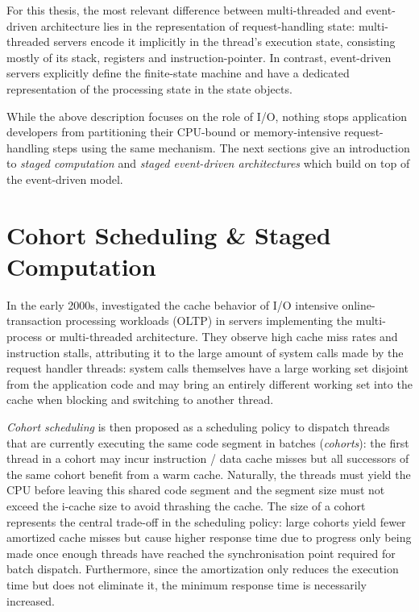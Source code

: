 \documentclass[12pt,a4paper]{book}
\begin{document}
For this thesis, the most relevant difference between multi-threaded and event-driven architecture lies in the representation of request-handling state:
multi-threaded servers encode it implicitly in the thread's execution state, consisting mostly of its stack, registers and instruction-pointer.
In contrast, event-driven servers explicitly define the finite-state machine and have a dedicated representation of the processing state in the state objects.

While the above description focuses on the role of I/O, nothing stops application developers from partitioning their CPU-bound or memory-intensive request-handling steps using the same mechanism.
The next sections give an introduction to \emph{staged computation} and \emph{staged event-driven architectures} which build on top of the event-driven model.

\section{Cohort Scheduling \& Staged Computation}\label{ch:relwork:cohort}
In the early 2000s, \citeauthor*{cohort} investigated the cache behavior of I/O intensive online-transaction processing workloads (OLTP) in servers implementing the multi-process or multi-threaded architecture.
They observe high cache miss rates and instruction stalls, attributing it to the large amount of system calls made by the request handler threads:
system calls themselves have a large working set disjoint from the application code and may bring an entirely different working set into the cache when blocking and switching to another thread.~\cite{cohort}

\emph{Cohort scheduling} is then proposed as a scheduling policy to dispatch threads that are currently executing the same code segment in batches (\emph{cohorts}):
the first thread in a cohort may incur instruction / data cache misses but all successors of the same cohort benefit from a warm cache.
Naturally, the threads must yield the CPU before leaving this shared code segment and the segment size must not exceed the i-cache size to avoid thrashing the cache.
The size of a cohort represents the central trade-off in the scheduling policy: large cohorts yield fewer amortized cache misses but cause higher response time due to progress only being made once enough threads have reached the synchronisation point required for batch dispatch.
Furthermore, since the amortization only reduces the execution time but does not eliminate it, the minimum response time is necessarily increased.~\cite{cohort}
\end{document}
